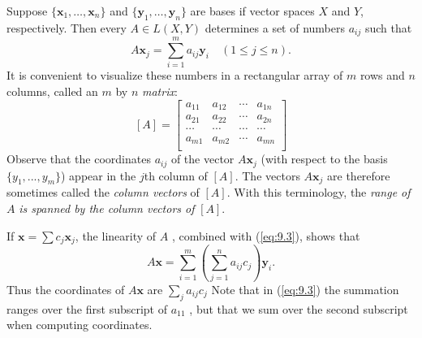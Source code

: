 \begin{myDef}
    Suppose $\{\mathbf{x}_1, \dots , \mathbf{x}_n\}$ 
    and $\{\mathbf{y}_1, \dots , \mathbf{y}_n\}$ are bases if vector spaces $X$ and $Y$, respectively.
    Then every $A \in L(X, Y)$ determines a set of numbers $a_{ij}$ such that 
    \begin{equation}
        \label{eq:9.3}
        A \mathbf{x}_j = 
        \sum_{i=1}^{m} a_{ij} \mathbf{y}_i
        \quad 
        (1 \leq j \leq n).
    \end{equation}
    It is convenient to visualize these numbers in a rectangular array of $m$ rows and $n$ columns, called an $m$ by $n$ \emph{matrix}:
    \begin{equation*}
        \left[ A \right] = 
        \begin{bmatrix}
            a_{11} & a_{12} & \cdots & a_{1n} \\
            a_{21} & a_{22} & \cdots & a_{2n} \\
            \cdots & \cdots & \cdots & \cdots \\
            a_{m1} & a_{m2} & \cdots & a_{mn} \\
        \end{bmatrix}
    \end{equation*}
    Observe that the coordinates $a_{ij}$ of the vector $A \mathbf{x}_j$ 
    (with respect to the basis $\{y_1, ... , y_m\}$) appear in the $j$th column of $[A]$. 
    The vectors $A \mathbf{x}_j$ are therefore sometimes called the \emph{column vectors} of $[A]$. 
    With this terminology, the \emph{range of} $A$ \emph{is spanned by the column vectors of} $[A]$.

    If $\mathbf{x} = \sum c_j \mathbf{x}_j$, the linearity of $A$ , combined with (\ref{eq:9.3}), shows that 
    \begin{equation}
        \label{eq:9.4}
        A \mathbf{x} = 
        \sum_{i=1}^{m} \left( 
            \sum_{j=1}^{n} a_{ij} c_j
         \right) 
         \mathbf{y}_i .
    \end{equation}
    Thus the coordinates of $A \mathbf{x}$ are $\sum_j a_{ij} c_j$ 
    Note that in (\ref{eq:9.3}) the summation ranges over the first subscript of $a_{11}$ , 
    but that we sum over the second subscript when computing coordinates.


\end{myDef}
